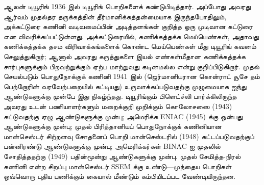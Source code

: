 \documentclass[../../../include/open-logic-section]{subfiles}
\begin{document}
\begin{history}
ஆலன் டியூரிங் 1936 இல் டியூரிங் பொறிகளைக் கண்டுபிடித்தார்.
அப்போது அவரது ஆர்வம் முதல்தர தருக்கத்தின் தீர்மானிக்கத்தன்மையாக
இருந்தபோதிலும், அக்கட்டுரை கணினி வடிவமைப்பின் அடித்தளங்கள் குறித்த
ஒரு முடிவான கட்டுரை என விவரிக்கப்பட்டுள்ளது. அக்கட்டுரையில்,
கணிக்கத்தக்க மெய்யெண்கள், அதாவது கணிக்கத்தக்க தசம விரிவாக்கங்களைக்
கொண்ட மெய்யெண்கள் மீது டியூரிங் கவனம் செலுத்துகிறார்; ஆனால் அவரது
கருத்துகளை இயல் எண்கள்மீதான கணிக்கத்தக்க சார்புகளுக்கும் பிறவற்றுக்கும்
ஏற்ப மாற்றுவது கடினமல்ல என்று குறிப்பிடுகிறார். முதல் செயல்படும்
பொதுநோக்குக் கணினி 1941 இல் (ஜெர்மானியரான கொன்ராட் சூசே தம்
பெற்றோரின் வரவேற்பறையில் கட்டியது) உருவாக்கப்படுவதற்கு முழுமையாக
ஐந்து ஆண்டுகளுக்கு முன்பே இது நிகழ்ந்தது. டியூரிங்கும் பிளெட்ச்லி
பார்க்கிலிருந்த அவரது உடன் பணியாளர்களும் மறைக்குறி முறிக்கும்
கொலோசஸை (1943) கட்டுவதற்கு ஏழு ஆண்டுகளுக்கு முன்பு; அமெரிக்க
ENIAC (1945) க்கு ஒன்பது ஆண்டுகளுக்கு முன்பு; முதல் பிரித்தானியப்
பொதுநோக்குக் கணினியான மான்செஸ்டர் சிற்றளவு சோதனைப் பொறி
மான்செஸ்டரில் (1948) கட்டப்படுவதற்குப் பன்னிரண்டு ஆண்டுகளுக்கு
முன்பு; அமெரிக்கர்கள் BINAC ஐ முதலில் சோதித்ததற்கு (1949)
பதின்மூன்று ஆண்டுகளுக்கு முன்பு. முதல் சேமித்த-நிரல் கணினி என்ற
சிறப்பு மான்செஸ்டர் SSEM க்கு உண்டு---முந்தைய பொறிகள் ஒவ்வொரு
புதிய பணிக்கும் கையால் மீண்டும் கம்பியிடப்பட வேண்டியிருந்தன.
\end{history}
\end{document}
